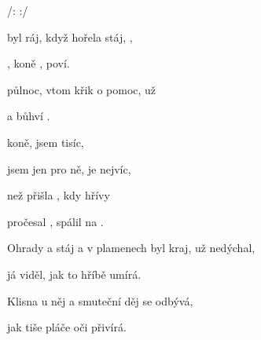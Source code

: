 

/:       :/

\zs

 byl ráj, když hořela stáj, ,

, koně , poví.

 půlnoc, vtom křik o pomoc, už 

  a bůhví .
\ks

\zr
{} koně,  jsem tisíc,

 jsem jen pro ně,  je nejvíc,

než přišla , kdy hřívy 

pročesal , spálil na .
\kr


\zs
Ohrady a stáj a v plamenech byl kraj, už nedýchal,

já viděl, jak to hříbě umírá.

Klisna u něj a smuteční děj se odbývá,

jak tiše pláče oči přivírá.

\ks

\zr
\kr
\kp













































